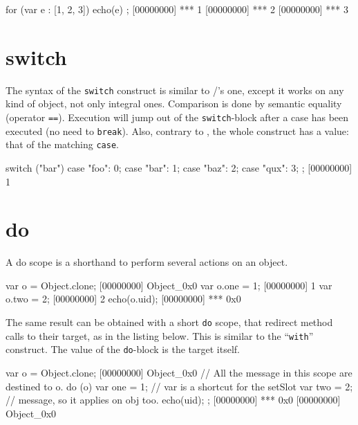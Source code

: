 \begin{urbiscript}
for (var e : [1, 2, 3]) { echo(e) };
[00000000] *** 1
[00000000] *** 2
[00000000] *** 3
\end{urbiscript}

\section{switch}

The syntax of the \lstinline|switch| construct is similar to \C/\Cxx's
one, except it works on any kind of object, not only integral
ones. Comparison is done by semantic equality (operator
\lstinline{==}). Execution will jump out of the
\lstinline|switch|-block after a case has been executed (no need to
\lstinline{break}).  Also, contrary to \Cxx, the whole construct has a
value: that of the matching \lstinline{case}.

\begin{urbiscript}
switch ("bar")
{
  case "foo":  0;
  case "bar":  1;
  case "baz":  2;
  case "qux":  3;
};
[00000000] 1
\end{urbiscript}

\section{do}
\label{section:constructs/do}

A do scope is a shorthand to perform several actions on an
object.

\begin{urbiscript}
var o = Object.clone;
[00000000] Object_0x0
var o.one = 1;
[00000000] 1
var o.two = 2;
[00000000] 2
echo(o.uid);
[00000000] *** 0x0
\end{urbiscript}

The same result can be obtained with a short \lstinline|do| scope, that redirect
method calls to their target, as in the listing below. This is
similar to the \pascal ``\lstinline{with}'' construct.  The value of
the \lstinline{do}-block is the target itself.

\begin{urbiscript}
var o = Object.clone;
[00000000] Object_0x0
// All the message in this scope are destined to o.
do (o)
{
 var one = 1; // var is a shortcut for the setSlot
 var two = 2; // message, so it applies on obj too.
 echo(uid);
};
[00000000] *** 0x0
[00000000] Object_0x0
\end{urbiscript}




